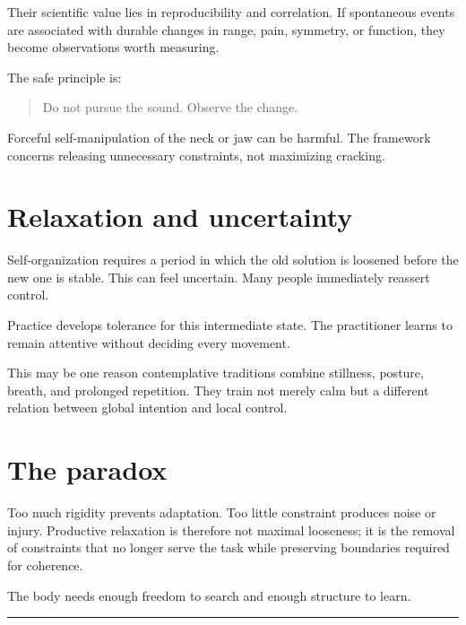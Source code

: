 Their scientific value lies in reproducibility and correlation. If spontaneous events are associated with durable changes in range, pain, symmetry, or function, they become observations worth measuring.

The safe principle is:

\begin{quote}
Do not pursue the sound. Observe the change.
\end{quote}

Forceful self-manipulation of the neck or jaw can be harmful. The framework concerns releasing unnecessary constraints, not maximizing cracking.

\section{Relaxation and uncertainty}

Self-organization requires a period in which the old solution is loosened before the new one is stable. This can feel uncertain. Many people immediately reassert control.

Practice develops tolerance for this intermediate state. The practitioner learns to remain attentive without deciding every movement.

This may be one reason contemplative traditions combine stillness, posture, breath, and prolonged repetition. They train not merely calm but a different relation between global intention and local control.

\section{The paradox}

Too much rigidity prevents adaptation. Too little constraint produces noise or injury. Productive relaxation is therefore not maximal looseness; it is the removal of constraints that no longer serve the task while preserving boundaries required for coherence.

The body needs enough freedom to search and enough structure to learn.

\begin{center}\rule{0.5\linewidth}{0.5pt}\end{center}
